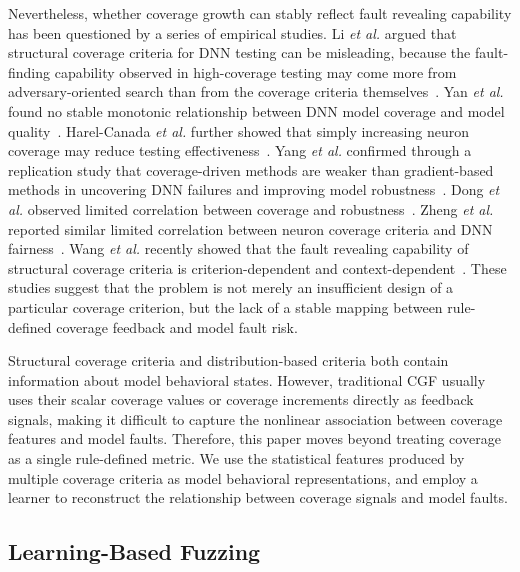 \documentclass[preprint,number,5p,twocolumn]{elsarticle}
\begin{document}
Nevertheless, whether coverage growth can stably reflect fault revealing capability has been questioned by a series of empirical studies. Li \emph{et al.} argued that structural coverage criteria for DNN testing can be misleading, because the fault-finding capability observed in high-coverage testing may come more from adversary-oriented search than from the coverage criteria themselves~\cite{LiM0C19}. Yan \emph{et al.} found no stable monotonic relationship between DNN model coverage and model quality~\cite{YanTLZMX020}. Harel-Canada \emph{et al.} further showed that simply increasing neuron coverage may reduce testing effectiveness~\cite{Harel-CanadaWGG20}. Yang \emph{et al.} confirmed through a replication study that coverage-driven methods are weaker than gradient-based methods in uncovering DNN failures and improving model robustness~\cite{YangSAL22}. Dong \emph{et al.} observed limited correlation between coverage and robustness~\cite{DongZWLSH0WDD20}. Zheng \emph{et al.} reported similar limited correlation between neuron coverage criteria and DNN fairness~\cite{zheng2024empirical}. Wang \emph{et al.} recently showed that the fault revealing capability of structural coverage criteria is criterion-dependent and context-dependent~\cite{WangXFCLL24}. These studies suggest that the problem is not merely an insufficient design of a particular coverage criterion, but the lack of a stable mapping between rule-defined coverage feedback and model fault risk.

Structural coverage criteria and distribution-based criteria both contain information about model behavioral states. However, traditional CGF usually uses their scalar coverage values or coverage increments directly as feedback signals, making it difficult to capture the nonlinear association between coverage features and model faults. Therefore, this paper moves beyond treating coverage as a single rule-defined metric. We use the statistical features produced by multiple coverage criteria as model behavioral representations, and employ a learner to reconstruct the relationship between coverage signals and model faults.

\subsection{Learning-Based Fuzzing}
\end{document}
